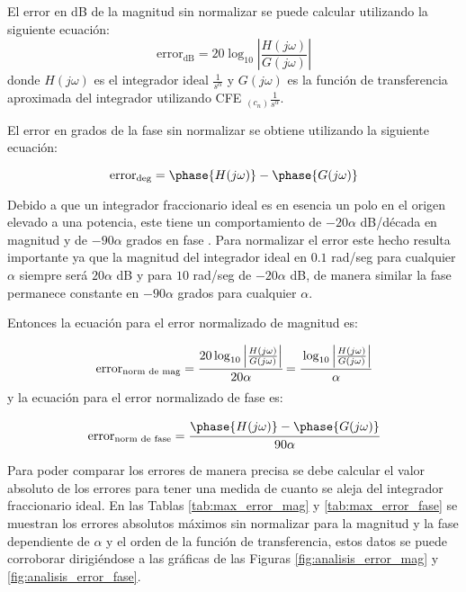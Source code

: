 	El error en dB de la magnitud sin normalizar se puede calcular utilizando la siguiente ecuación:
	\begin{equation}
		\mathrm{error}_{\mathrm{dB}} = 20\log_{10} \left| \frac{H(j\omega)}{G(j\omega)} \right|
		\label{ec:error_sin_norm}
	\end{equation}
	donde $H(j\omega)$ es el integrador ideal $\frac{1}{s^{\alpha}}$ y $G(j\omega)$ es la función de transferencia aproximada del integrador utilizando CFE $ _{(c_{n})} \frac{1}{s^{\alpha}}$. 
	
	El error en grados de la fase sin normalizar se obtiene utilizando la siguiente ecuación:
	
	\begin{equation}
		\mathrm{error}_{\mathrm{deg}} = \phase{H(j\omega)} - \phase{G(j\omega)}
	\end{equation}
	
	Debido a que un integrador fraccionario ideal es en esencia un polo en el origen elevado a una potencia, este tiene un comportamiento de $-20 \alpha$ dB/década en magnitud y de $-90\alpha$ grados en fase \cite{CharlesAlexander2016}. Para normalizar el error este hecho resulta importante ya que la magnitud del integrador ideal en $0.1$ rad/seg para cualquier $\alpha$ siempre será $20 \alpha$ dB y para $10$ rad/seg de $-20 \alpha$ dB, de manera similar la fase permanece constante en $-90\alpha$ grados para cualquier $\alpha$.
	
	Entonces la ecuación para el error normalizado de magnitud es:
	
	\begin{equation}
		\mathrm{error}_{\mathrm{norm\,\,de\,\,mag}} = \cfrac{ 20\log_{10} \left| \frac{H(j\omega)}{G(j\omega)} \right| }{20 \alpha} = \cfrac{ \log_{10} \left| \frac{H(j\omega)}{G(j\omega)} \right| }{ \alpha}
	\end{equation}
	y la ecuación para el error normalizado de fase es:
	
	\begin{equation}
		\mathrm{error}_{\mathrm{norm\,\,de\,\,fase}} = \cfrac{\phase{H(j\omega)} - \phase{G(j\omega)}}{90\alpha}
	\end{equation}
	
	Para poder comparar los errores de manera precisa se debe calcular el valor absoluto de los errores para tener una medida de cuanto se aleja del integrador fraccionario ideal. En las Tablas \ref{tab:max_error_mag} y \ref{tab:max_error_fase} se muestran los errores absolutos máximos sin normalizar para la magnitud y la fase dependiente de $\alpha$ y el orden de la función de transferencia, estos datos se puede corroborar dirigiéndose a las gráficas de las Figuras \ref{fig:analisis_error_mag} y \ref{fig:analisis_error_fase}.
	
